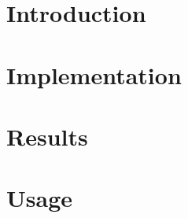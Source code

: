 
\maketitle

\section{Introduction}


\section{Implementation}


\section{Results}


\section{Usage}




